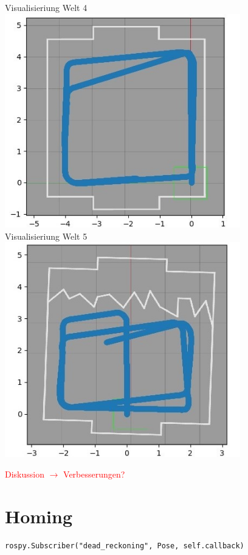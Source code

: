 \documentclass[12pt, a4paper]{report}
\begin{document}
\begin{centering}
Visualisieriung Welt 4\\
\includegraphics[width=290pt]{roboter_pfad4.jpg}\newpage
~\\
Visualisieriung Welt 5\\
\includegraphics[width=290pt]{roboter_pfad5.jpg}\\
\end{centering}


\textcolor{red}{Diskussion $\rightarrow$ Verbesserungen?}
\newline

\section{Homing}
\begin{lstlisting}
rospy.Subscriber("dead_reckoning", Pose, self.callback)
\end{lstlisting}
\end{document}
